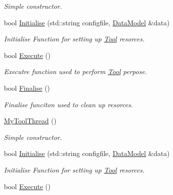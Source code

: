 \begin{DoxyCompactItemize}
\begin{DoxyCompactList}\small\item\em Simple constructor. \end{DoxyCompactList}\item 
bool \hyperlink{classMyToolThread_adc7ab1ab74fc1564f07e52e63383d679}{Initialise} (std\-::string configfile, \hyperlink{classDataModel}{Data\-Model} \&data)
\begin{DoxyCompactList}\small\item\em Initialise Function for setting up \hyperlink{classTool}{Tool} resorces. \end{DoxyCompactList}\item 
\hypertarget{classMyToolThread_a9b582cd202d5578682d57d973988df3c}{bool \hyperlink{classMyToolThread_a9b582cd202d5578682d57d973988df3c}{Execute} ()}\label{classMyToolThread_a9b582cd202d5578682d57d973988df3c}

\begin{DoxyCompactList}\small\item\em Executre function used to perform \hyperlink{classTool}{Tool} perpose. \end{DoxyCompactList}\item 
\hypertarget{classMyToolThread_aa51e385684efcb19f1c039b96653070e}{bool \hyperlink{classMyToolThread_aa51e385684efcb19f1c039b96653070e}{Finalise} ()}\label{classMyToolThread_aa51e385684efcb19f1c039b96653070e}

\begin{DoxyCompactList}\small\item\em Finalise funciton used to clean up resorces. \end{DoxyCompactList}\item 
\hypertarget{classMyToolThread_a66c6fc304a8d62436281598d988dd845}{\hyperlink{classMyToolThread_a66c6fc304a8d62436281598d988dd845}{My\-Tool\-Thread} ()}\label{classMyToolThread_a66c6fc304a8d62436281598d988dd845}

\begin{DoxyCompactList}\small\item\em Simple constructor. \end{DoxyCompactList}\item 
bool \hyperlink{classMyToolThread_adc7ab1ab74fc1564f07e52e63383d679}{Initialise} (std\-::string configfile, \hyperlink{classDataModel}{Data\-Model} \&data)
\begin{DoxyCompactList}\small\item\em Initialise Function for setting up \hyperlink{classTool}{Tool} resorces. \end{DoxyCompactList}\item 
\hypertarget{classMyToolThread_a9b582cd202d5578682d57d973988df3c}{bool \hyperlink{classMyToolThread_a9b582cd202d5578682d57d973988df3c}{Execute} ()}\label{classMyToolThread_a9b582cd202d5578682d57d973988df3c}


\end{DoxyCompactItemize}
